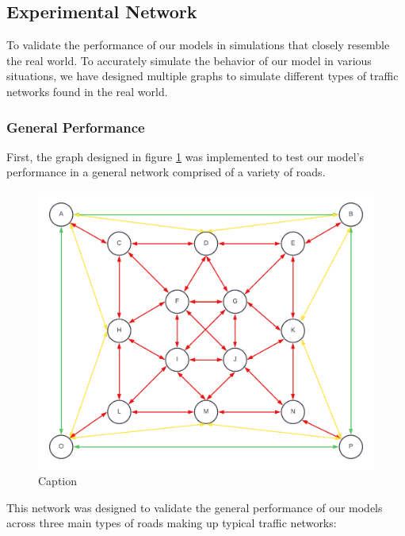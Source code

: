 \documentclass[conference]{IEEEtran}
\begin{document}
\subsection{Experimental Network}

To validate the performance of our models in simulations that closely resemble the real world. To accurately simulate the behavior of our model in various situations, we have designed multiple graphs to simulate different types of traffic networks found in the real world.

\subsubsection{General Performance}

First, the graph designed in figure \ref{fig:testNetwork} was implemented to test our model's performance in a general network comprised of a variety of roads.

\begin{figure}
    \centering
    \includegraphics[scale=0.20]{captures/testNetwork.png}
    \caption{Caption}
    \label{fig:testNetwork}
\end{figure}

This network was designed to validate the general performance of our models across three main types of roads making up typical traffic networks:
\end{document}
